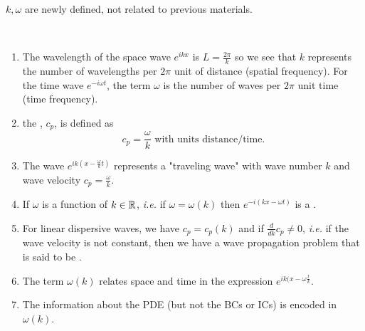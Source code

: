 \documentclass[class=article,crop=false]{standalone}
\begin{document}
\begin{notation}[]
$ k, \omega$ are newly defined, not related to previous materials.
\end{notation}

\begin{defn}
~\begin{enumerate}[label=\arabic*)]
	\item The wavelength of the space wave $ e^{ikx} $ is $ L = \frac{2\pi}{k }$ so we see that $ k$ represents the number of wavelengths per  $ 2\pi $ unit of distance (spatial frequency). For the time wave $ e^{-i\omega t}$, the term $ \omega$ is the number of waves per $ 2\pi$ unit time (time frequency).
	\item the , $ c_p$, is defined as
		 \[
		c_p = \frac{\omega}{k } \text{ with units distance/time} 
		.\] 
	\item The wave $ e^{ik(x-\frac{\omega}{k }t)}$ represents a "traveling wave" with wave number $ k$ and wave velocity  $ c_p = \frac{\omega}{k}$.
	\item If $ \omega$ is a function of $ k \in \mathbb{R}$, \emph{i.e.} if $ \omega = \omega(k)$ then $ e^{-i(kx-\omega t)}$ is a .
	\item For linear dispersive waves, we have $ c_p = c_p(k)$ and if $ \frac{d}{dk} c_p \neq 0$, \emph{i.e.} if the wave velocity is not constant, then we have a wave propagation problem that is said to be . 
	\item The term $ \omega(k)$ relates space and time in the expression $ e^{ik(x-\omega \frac{t}{k} }$.
	\item The information about the PDE (but not the BCs or ICs) is encoded in $ \omega(k)$.
\end{enumerate}
\end{defn}
\end{document}
